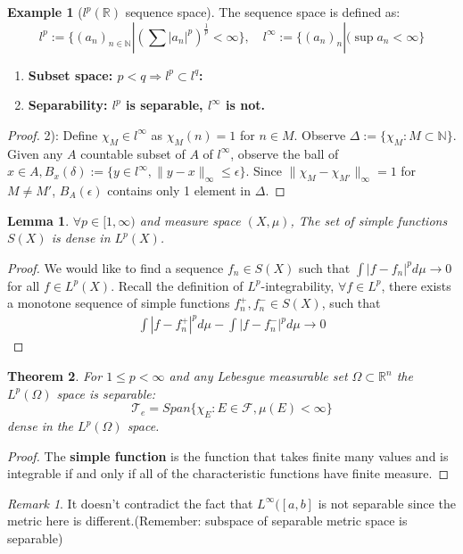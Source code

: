 \documentclass[a4paper,11pt,fleqn]{book}
\newtheorem{theorem}{Theorem}[section]
\newtheorem{lemma}[theorem]{Lemma}
\theoremstyle{definition}
\newtheorem*{example}{Example}
\theoremstyle{remark}
\newtheorem*{remark}{Remark}
\begin{document}
\begin{example}[$l^p(\mathbb{R})$ sequence space]
The sequence space is defined as:
\begin{equation*}
	l^p := \{(a_n)_{n \in \mathbb{N}} | (\sum |a_n|^p)^{\frac{1}{p}} < \infty \}, \quad l^\infty := \{(a_n)_n | (\sup a_n < \infty\}
\end{equation*}

\begin{enumerate}
	\item \textbf{Subset space: $p<q \Rightarrow l^p \subset l^q$:}
	\item \textbf{Separability: $l^p$ is separable, $l^\infty$ is not.}
\end{enumerate}
\begin{proof}
	2): Define $\chi_M \in l^\infty$ as $\chi_M(n) = 1$ for $n \in M$. Observe $\Delta:= \{\chi_M: M \subset \mathbb{N}\}$. Given any $A$ countable subset of $A$ of $l^\infty$, observe the ball of $x \in A, B_x(\delta):= \{ y \in l^\infty, \|y - x\|_\infty \le \epsilon\}$. Since $\|\chi_M - \chi_{M'}\|_\infty = 1$ for $M \neq M'$, $B_A(\epsilon)$ contains only 1 element in $\Delta$.  
\end{proof}
\end{example}

\begin{lemma}
	$\forall p \in [1, \infty)$ and measure space $(X, \mu)$, The set of simple functions $S(X)$ is dense in $L^p(X)$.
\end{lemma}
\begin{proof}
	We would like to find a sequence $f_n \in S(X)$ such that $\int |f - f_n|^p d\mu \rightarrow 0$ for all $f \in L^p(X)$. Recall the definition of $L^p$-integrability, $\forall f \in L^p$, there exists a monotone sequence of simple functions $f_n^+, f_n^- \in S(X)$, such that 
	\begin{align*}
		\int |f - f^+_n|^p d\mu -\int |f - f^-_n|^p d\mu  \rightarrow 0
	\end{align*}
\end{proof}

\begin{theorem}
	For $1 \leq p < \infty$ and any Lebesgue measurable set $\Omega \subset \mathbb{R}^n$  the $L^p(\Omega)$ space is separable:
	\begin{equation*}
		\mathcal{T}_e = Span\{ \chi_E: E \in \mathcal{F}, \mu(E) < \infty\}
	\end{equation*}
	dense in the $L^p(\Omega)$ space. 
\end{theorem}
\begin{proof}
	The \textbf{simple function} is the function that takes finite many values and is integrable if and only if all of the characteristic functions have finite measure.
\end{proof}
\begin{remark}
It doesn't contradict the fact that $L^\infty([a, b]$ is not separable since the metric here is different.(Remember: subspace of separable metric space is separable) 	
\end{remark}
\end{document}
